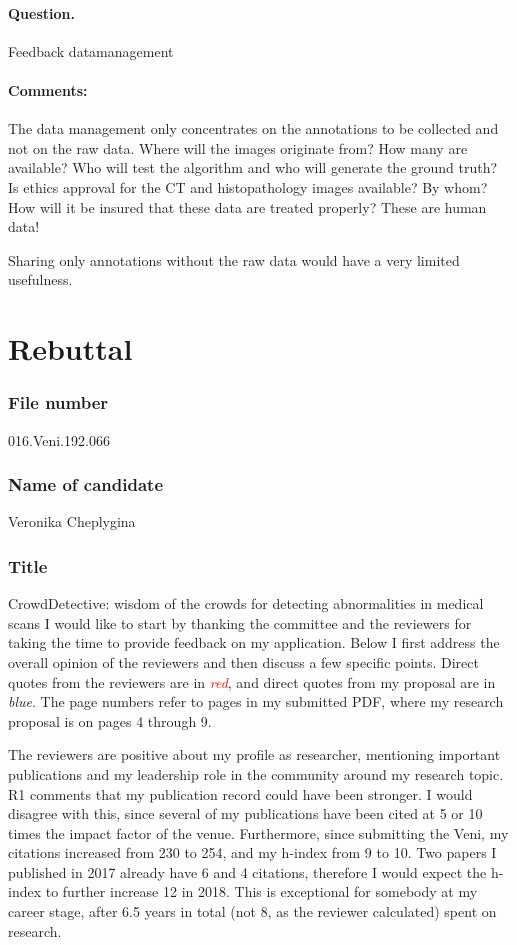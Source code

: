 \documentclass[serif, twocolumn, numeric, rga]{jote-article}
\begin{document}
\paragraph{Question.}
Feedback datamanagement
\paragraph{Comments:}
The data management only concentrates on the annotations to be collected and not on the raw data. Where will the images originate from? How many are available? Who will test the algorithm and who will generate the ground truth? Is ethics approval for the CT and histopathology images available? By whom? How will it be insured that these data are treated properly? These are human data!

Sharing only annotations without the raw data would have a very limited usefulness.


\section*{Rebuttal}
 {}\subsubsection*{File number} 
016.Veni.192.066
 {}\subsubsection*{Name of candidate} 
Veronika Cheplygina
 {}\subsubsection*{Title} 
CrowdDetective: wisdom of the crowds for detecting abnormalities in medical scans
\vskip5pt
\noindent I would like to start by thanking the committee and the reviewers for taking the time to provide feedback on my application. Below I first address the overall opinion of the reviewers and then discuss a few specific points. Direct quotes from the reviewers are in \textit{\textcolor{red}{red}}, and direct quotes from my proposal are in \textit{\textcolor{jotedark}{blue}}. The page numbers refer to pages in my submitted PDF, where my research proposal is on pages 4 through 9.

The reviewers are positive about my profile as researcher, mentioning important publications and my leadership role in the community around my research topic. R1 comments that my publication record could have been stronger. I would disagree with this, since several of my publications have been cited at 5 or 10 times the impact factor of the venue. Furthermore, since submitting the Veni, my citations increased from 230 to 254, and my h-index from 9 to 10. Two papers I published in 2017 already have 6 and 4 citations, therefore I would expect the h-index to further increase 12 in 2018. This is exceptional for somebody at my career stage, after 6.5 years in total (not 8, as the reviewer calculated) spent on research.
\end{document}
